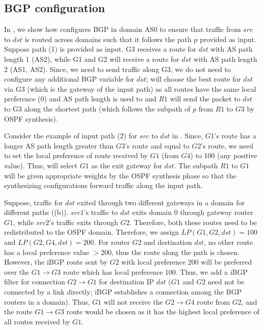 \subsection{BGP configuration}
In , we show how \name configures BGP in domain AS0 
to ensure that traffic from $src$ to $dst$ is routed across domains 
such that it follows the path $p$ provided as input. Suppose path (1) is
provided as input. G3 receives a route for $dst$ with AS path length 1
(AS2), while G1 and G2 will receive a route for $dst$ with 
AS path length 2 (AS1, AS2). Since, we need to send traffic along
G3, we do not need to configure any additional BGP variable for $dst$;
 will choose the best route for $dst$ 
via G3 (which is the gateway of the input path) as all routes have
the same local preference (0) and AS path length is used to  and $R1$ will
send the packet to $dst$ to G3 along the shortest path (which 
follows the subpath of $p$ from $R1$ to $G3$ by OSPF synthesis). 

Consider the example of input path (2) for $src$ to $dst$ 
in . Since, $G1$'s route has a longer AS 
path length greater than $G3$'s route and equal to $G2$'s route,
we need to set the local preference of route received by $G1$ 
(from $G4$) to 100 (any positive value). Thus,  
will select $G1$ as the exit gateway for $dst$. The subpath
$R1$ to $G1$ will be given appropriate weights by the OSPF
synthesis phase so that the synthesizing configurations 
forward traffic along the input path. 

Suppose, traffic for $dst$ exited through two different
gateways in a domain for different paths ((b)).
$src1$'s traffic to $dst$ exits domain 0 through 
gateway router $G1$, while $src2$'s traffic exits 
through $G2$. Therefore, both these routes need to be 
redistributed to the OSPF domain. Therefore, we assign
$LP(G1,G2,dst) = 100$ and $LP(G2,G4,dst) = 200$. For 
router $G2$ and destination $dst$, 
no other route has a local preference value $>200$, thus 
the route along the path is chosen. However, the iBGP route
sent by $G2$ with local preference 200 will be preferred over
the $G1\rightarrow G3$ route which has local preference 100.
Thus, we add a iBGP filter for connection $G2 \rightarrow G1$ for
destination IP $dst$ ($G1$ and $G2$ need not be connected by a 
link directly; iBGP establishes a connection among the 
BGP routers in a domain). Thus, $G1$ will not receive the
$G2 \rightarrow G4$ route from $G2$, and the route $G1 \rightarrow
G3$ route would be chosen as it has the highest local preference
of all routes received by $G1$. 

